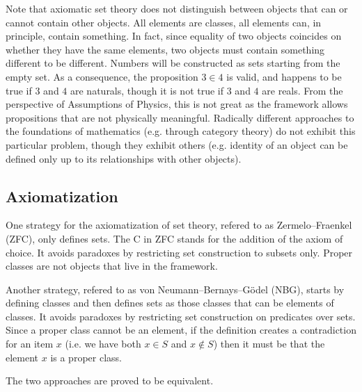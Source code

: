 \documentclass{article}
\begin{document}
Note that axiomatic set theory does not distinguish between objects that can or cannot contain other objects. All elements are classes, all elements can, in principle, contain something. In fact, since equality of two objects coincides on whether they have the same elements, two objects must contain something different to be different. Numbers will be constructed as sets starting from the empty set. As a consequence, the proposition $3 \in 4$ is valid, and happens to be true if $3$ and $4$ are naturals, though it is not true if $3$ and $4$ are reals. From the perspective of Assumptions of Physics, this is not great as the framework allows propositions that are not physically meaningful. Radically different approaches to the foundations of mathematics (e.g. through category theory) do not exhibit this particular problem, though they exhibit others (e.g. identity of an object can be defined only up to its relationships with other objects).

\subsection{Axiomatization}

One strategy for the axiomatization of set theory, refered to as Zermelo–Fraenkel (ZFC), only defines sets. The C in ZFC stands for the addition of the axiom of choice. It avoids paradoxes by restricting set construction to subsets only. Proper classes are not objects that live in the framework.

Another strategy, refered to as von Neumann–Bernays–Gödel (NBG), starts by defining classes and then defines sets as those classes that can be elements of classes. It avoids paradoxes by restricting set construction on predicates over sets. Since a proper class cannot be an element, if the definition creates a contradiction for an item $x$ (i.e. we have both $x \in S$ and $x \notin S$) then it must be that the element $x$ is a proper class.

The two approaches are proved to be equivalent.
\end{document}
